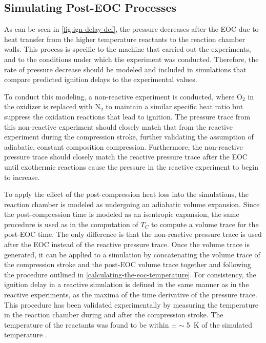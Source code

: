 \documentclass[12pt]{../ussci}
\begin{document}
\subsection{Simulating Post-EOC Processes}\label{simulating-post-eoc-processes}

As can be seen in \cref{fig:ign-delay-def}, the pressure
decreases after the EOC due to heat transfer from the higher temperature
reactants to the reaction chamber walls. This process is specific to the
machine that carried out the experiments, and to the conditions under
which the experiment was conducted. Therefore, the rate of pressure
decrease should be modeled and included in simulations that compare
predicted ignition delays to the experimental values.

To conduct this modeling, a non-reactive experiment is conducted, where
\(\text{O}_2\) in the oxidizer is replaced with \(\text{N}_2\) to
maintain a similar specific heat ratio but suppress the oxidation
reactions that lead to ignition. The pressure trace from this
non-reactive experiment should closely match that from the reactive
experiment during the compression stroke, further validating the
assumption of adiabatic, constant composition compression. Furthermore,
the non-reactive pressure trace should closely match the reactive
pressure trace after the EOC until exothermic reactions cause the
pressure in the reactive experiment to begin to increase.

To apply the effect of the post-compression heat loss into the
simulations, the reaction chamber is modeled as undergoing an adiabatic
volume expansion. Since the post-compression time is modeled as an
isentropic expansion, the same procedure is used as in the computation
of \(T_C\) to compute a volume trace for the post-EOC time. The only
difference is that the non-reactive pressure trace is used after the EOC
instead of the reactive pressure trace. Once the volume trace is
generated, it can be applied to a simulation by concatenating the volume
trace of the compression stroke and the post-EOC volume trace together
and following the procedure outlined in \cref{calculating-the-eoc-temperature}.
For consistency, the ignition delay in a reactive
simulation is defined in the same manner as in the reactive experiments,
as the maxima of the time derivative of the pressure trace. This
procedure has been validated experimentally by measuring the temperature
in the reaction chamber during and after the compression stroke. The
temperature of the reactants was found to be within $\pm\sim $\SI{5}{\K} of the
simulated temperature \autocite{Das2012a,Uddi2012}.
\end{document}
